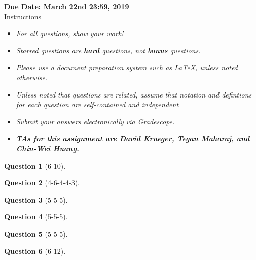 \documentclass[12pt]{article}
\theoremstyle{definition}
\newtheorem{exercise}{Question}%
\begin{document}
\fancyhead{}
\fancyfoot{}


\vspace{1cm}

\shorthandoff{:}
{\bf Due Date: March 22nd 23:59, 2019}\\

\vspace{-0.5cm}
\underline{Instructions}
\renewcommand{\labelitemi}{\textbullet}
\begin{itemize}
\item \emph{For all questions, show your work!}
\item \emph{Starred questions are \textbf{hard} questions, not \textbf{bonus} questions.}
\item \emph{Please use a document preparation system such as LaTeX, unless noted otherwise.}
\item \emph{Unless noted that questions are related, assume that notation and defintions for each question are self-contained and independent}
\item \emph{Submit your answers electronically via Gradescope.}
\item \emph{\textbf{TAs for this assignment are David Krueger, Tegan Maharaj, and Chin-Wei Huang.}}
\end{itemize}


\begin{exercise}[6-10]

\end{exercise}

\begin{exercise}[4-6-4-4-3]

\end{exercise}

\begin{exercise}[5-5-5]

\end{exercise}

\begin{exercise}[5-5-5]

\end{exercise}

\begin{exercise}[5-5-5]

\end{exercise}

\begin{exercise}[6-12]

\end{exercise}
\end{document}
